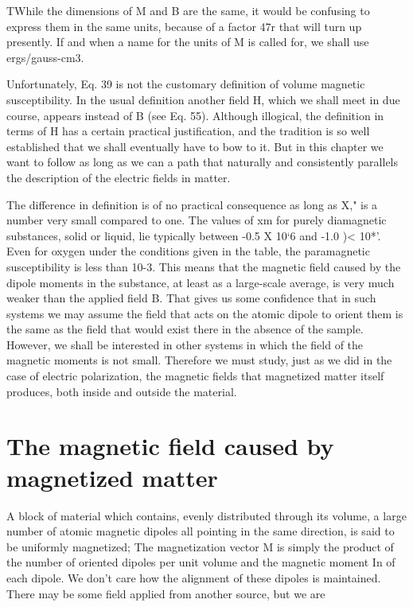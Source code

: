TWhile the dimensions of M and B are the same, it would be confusing to express
them in the same units, because of a factor 47r that will turn up presently. If and
when a name for the units of M is called for, we shall use ergs/gauss-cm3.

Unfortunately, Eq. 39 is not the customary definition of volume
magnetic susceptibility. In the usual definition another field H,
which we shall meet in due course, appears instead of B (see Eq. 55).
Although illogical, the definition in terms of H has a certain practical
justification, and the tradition is so well established that we shall
eventually have to bow to it. But in this chapter we want to follow
as long as we can a path that naturally and consistently parallels the
description of the electric fields in matter.

The difference in definition is of no practical consequence as long
as X," is a number very small compared to one. The values of xm
for purely diamagnetic substances, solid or liquid, lie typically between
-0.5 X 10‘6 and -1.0 )< 10*'. Even for oxygen under the
conditions given in the table, the paramagnetic susceptibility is less
than 10-3. This means that the magnetic field caused by the dipole
moments in the substance, at least as a large-scale average, is very
much weaker than the applied field B. That gives us some confidence
that in such systems we may assume the field that acts on the
atomic dipole to orient them is the same as the field that would exist
there in the absence of the sample. However, we shall be interested
in other systems in which the field of the magnetic moments is not
small. Therefore we must study, just as we did in the case of electric
polarization, the magnetic fields that magnetized matter itself 
produces, both inside and outside the material.

\section{The magnetic field caused by magnetized matter}

A block of material which contains, evenly distributed through its
volume, a large number of atomic magnetic dipoles all pointing in
the same direction, is said to be uniformly magnetized; The magnetization
vector M is simply the product of the number of oriented
dipoles per unit volume and the magnetic moment In of each dipole.
We don't care how the alignment of these dipoles is maintained.
There may be some field applied from another source, but we are

